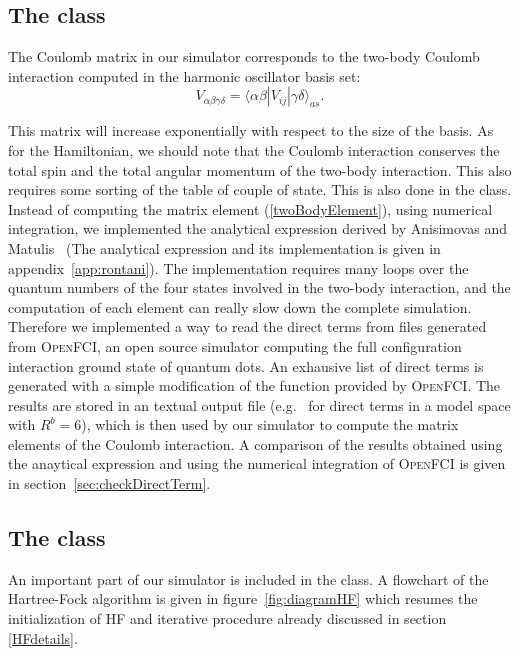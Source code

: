\subsection{The  class}
The Coulomb matrix in our simulator corresponds to the two-body Coulomb interaction computed in the harmonic oscillator basis set:
\begin{equation}
  \nonumber
  V_{\alpha \beta \gamma \delta}=\langle \alpha \beta|V_{ij}| \gamma \delta \rangle_{as}.
\end{equation}

 This matrix will increase exponentially with respect to the size of the basis. As for the Hamiltonian, we should note that the Coulomb interaction conserves the total spin and the total angular momentum of the two-body interaction. This also requires some sorting of the table of couple of state. This is also done in the  class.
Instead of computing the matrix element (\ref{twoBodyElement}), using numerical integration, we implemented the analytical expression derived by Anisimovas and Matulis~\cite{anisimovasMatulis} (The analytical expression and its implementation is given in appendix~\ref{app:rontani}). The implementation requires many loops over the quantum numbers of the four states involved in the two-body interaction, and the  computation of each element can really slow down the complete simulation.
Therefore we implemented a way to read the direct terms from files generated from \textsc{OpenFCI}, an open source simulator computing the full configuration interaction ground state of quantum dots. An exhausive list of direct terms is generated with a simple modification of the  function provided by \textsc{OpenFCI}. The results are stored in an textual output file (e.g.\  for direct terms in a model space with $R^b=6$), which is then used by our simulator to compute the matrix elements of the Coulomb interaction. A comparison of the results obtained using the anaytical expression and using the numerical integration of \textsc{OpenFCI} is given in section~\ref{sec:checkDirectTerm}.


\subsection{The  class}
 An important part of our simulator is included in the  class. A flowchart of the Hartree-Fock algorithm is given in figure~\ref{fig:diagramHF} which resumes the initialization of HF and iterative procedure already discussed in section \ref{HFdetails}.

